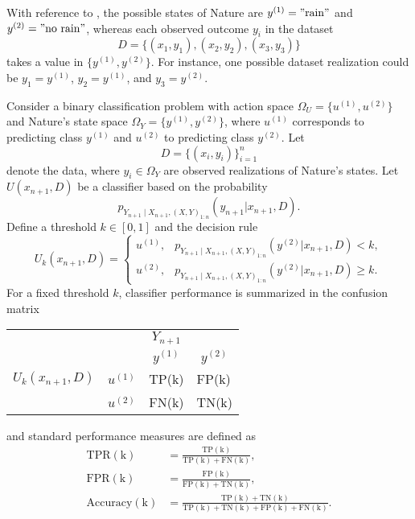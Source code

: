 \begin{example}
	With reference to , the possible states of Nature are $y^{(1)} = "\text{rain}"$ and $y^{(2)} = "\text{no rain}"$, whereas each observed outcome $y_i$ in the dataset 
	\begin{equation}
		D = \{(x_1,y_1),(x_2,y_2),(x_3,y_3)\}
	\end{equation}
	takes a value in $\{y^{(1)},y^{(2)}\}$. For instance, one possible dataset realization could be $y_1=y^{(1)}$, $y_2=y^{(1)}$, and $y_3=y^{(2)}$.
\end{example}

\begin{example}
	\label{ex:confusion}
	Consider a binary classification problem with action space $\Omega_U = \{u^{(1)},u^{(2)}\}$ and Nature's state space $\Omega_Y = \{y^{(1)}, y^{(2)}\}$, where $u^{(1)}$ corresponds to predicting class $y^{(1)}$ and $u^{(2)}$ to predicting class $y^{(2)}$. Let
	\begin{equation}
		D = \{(x_i,y_i)\}_{i=1}^n
	\end{equation}
	denote the data, where $y_i \in \Omega_Y$ are observed realizations of Nature's states. Let $U(x_{n+1},D)$ be a classifier based on the probability 
	\begin{equation}
		p_{Y_{n+1}\mid X_{n+1}, (X,Y)_{1\colon n}}(y_{n+1} | x_{n+1}, D).
	\end{equation}
	Define a threshold $k\in[0,1]$ and the decision rule
	\begin{equation}
		U_k(x_{n+1},D) =
		\begin{cases}
			u^{(1)}, & p_{Y_{n+1}\mid X_{n+1}, (X,Y)_{1\colon n}}(y^{(2)} | x_{n+1}, D) < k,\\
			u^{(2)}, & p_{Y_{n+1}\mid X_{n+1}, (X,Y)_{1\colon n}}(y^{(2)} | x_{n+1}, D) \ge k.
		\end{cases}
		\label{eq:decision_rule31}
	\end{equation}
	For a fixed threshold $k$, classifier performance is summarized in the confusion matrix
	\begin{center}
		\begin{tabular}{ c  c  c c}
			&& $Y_{n+1}$ &  \\
			&& $y^{(1)}$ & $y^{(2)}$ \\
			\cline{3-4}
			$U_k(x_{n+1},D)$ & $u^{(1)}$& \multicolumn{1}{|l}{TP(k)} & \multicolumn{1}{l|}{FP(k)}\\
			& $u^{(2)}$& \multicolumn{1}{|l}{FN(k)} & \multicolumn{1}{l|}{TN(k)}\\
			\cline{3-4}
		\end{tabular}
	\end{center}
	and standard performance measures are defined as
	\begin{align}
		\operatorname{TPR(k)} &= \frac{\operatorname{TP(k)}}{\operatorname{TP(k)} + \operatorname{FN(k)}},\\
		\operatorname{FPR(k)} &= \frac{\operatorname{FP(k)}}{\operatorname{FP(k)} + \operatorname{TN(k)}},\\
		\operatorname{Accuracy(k)} &= \frac{\operatorname{TP(k)} + \operatorname{TN(k)}}{\operatorname{TP(k)} + \operatorname{TN(k)} + \operatorname{FP(k)} + \operatorname{FN(k)}}.
	\end{align}
\end{example}
